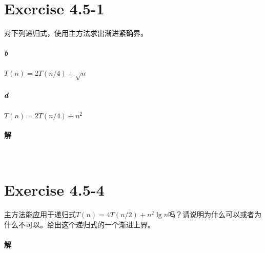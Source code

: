 \documentclass{article}
\begin{document}
\section{Exercise 4.5-1}
对下列递归式，使用主方法求出渐进紧确界。
\subparagraph{b}
$T(n)=2T(n/4)+\sqrt{n}$
\subparagraph{d}
$T(n)=2T(n/4)+n^2$
\\

\paragraph{解}
\\

\section{Exercise 4.5-4}
主方法能应用于递归式$T(n)=4T(n/2)+n^2\lg{n}$吗？请说明为什么可以或者为什么不可以。给出这个递归式的一个渐进上界。
\\

\paragraph{解}
\\
\end{document}
